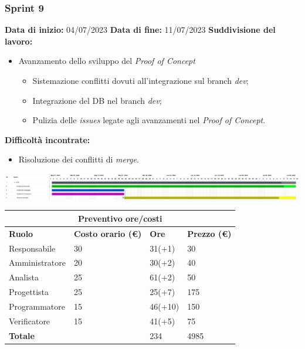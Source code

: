 \documentclass[a4paper, 12pt]{article}
\begin{document}
\subsubsection{Sprint 9}
\textbf{Data di inizio:} 04/07/2023\newline
\textbf{Data di fine:} 11/07/2023\newline
\newline
\textbf{Suddivisione del lavoro:}
\begin{itemize}
	\item Avanzamento dello sviluppo del \textit{Proof of Concept}
	      \begin{itemize}
		      \item Sistemazione conflitti dovuti all'integrazione sul branch \textit{dev};
		      \item Integrazione del DB nel branch \textit{dev};
		      \item Pulizia delle \textit{issues} legate agli avanzamenti nel \textit{Proof of Concept}.
	      \end{itemize}
\end{itemize}
\textbf{Difficoltà incontrate:}
\begin{itemize}
	\item Risoluzione dei conflitti di \textit{merge}.
\end{itemize}
\includegraphics[scale=0.176]{RTB_8.png}\newline
\newline
\begin{center}
	\begin{tabularx}{\textwidth}{|X|X|X|X|}
		\hline
		\multicolumn{4}{|c|}{\textbf{Preventivo ore/costi}}                                      \\
		\hline
		\hline
		\textbf{Ruolo}  & \textbf{Costo orario (\euro)} & \textbf{Ore} & \textbf{Prezzo (\euro)} \\
		\hline
		Responsabile    & 30                            & 31(+1)       & 30                      \\
		\hline
		Amministratore  & 20                            & 30(+2)       & 40                      \\
		\hline
		Analista        & 25                            & 61(+2)       & 50                      \\
		\hline
		Progettista     & 25                            & 25(+7)       & 175                     \\
		\hline
		Programmatore   & 15                            & 46(+10)      & 150                     \\
		\hline
		Verificatore    & 15                            & 41(+5)       & 75                      \\
		\hline
		\hline
		\textbf{Totale} &                               & 234          & 4985                    \\
		\hline
	\end{tabularx}\\[8pt]
	\mbox{}\\
\end{center}
\end{document}
